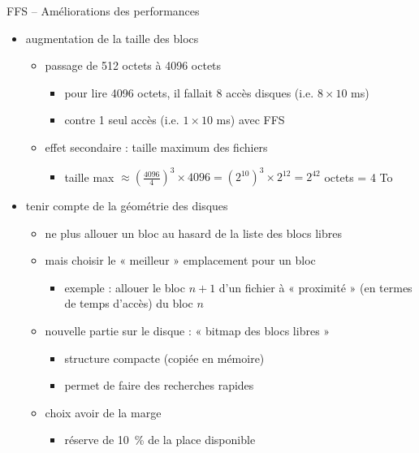\begin {frame} {FFS -- Améliorations des performances}
    \begin {itemize}
	\item augmentation de la taille des blocs
	    \begin {itemize}
		\item passage de 512 octets à 4096 octets
		    \begin {itemize}
			\item pour lire 4096 octets, il fallait 8 accès
			    disques (i.e. $8 \times 10$ ms)
			\item contre 1 seul accès (i.e. $1 \times 10$
			    ms) avec FFS
		    \end {itemize}
		\item effet secondaire : taille maximum des fichiers
		    \begin {itemize}
			\item taille max $
			    \approx (\frac {4096} {4})^3 \times 4096
			    = (2^{10})^3 \times 2^{12}
			    = 2^{42}$ octets = 4 To
		    \end {itemize}
	    \end {itemize}
	\item tenir compte de la géométrie des disques
	    \begin {itemize}
		\item ne plus allouer un bloc au hasard de la liste
		    des blocs libres
		\item mais choisir le « meilleur » emplacement pour
		    un bloc
		    \begin {itemize}
			\item exemple : allouer le bloc $n+1$ d'un
			    fichier à « proximité » (en termes de
			    temps d'accès) du bloc $n$
		    \end {itemize}
		\item nouvelle partie sur le disque : « bitmap des
		    blocs libres »
		    \begin {itemize}
			\item structure compacte (copiée en mémoire)
			\item permet de faire des recherches rapides
		    \end {itemize}
		\item choix \implique avoir de la marge
		    \begin {itemize}
			\item réserve de 10~\% de la place disponible
		    \end {itemize}
	    \end {itemize}
    \end {itemize}
\end {frame}

